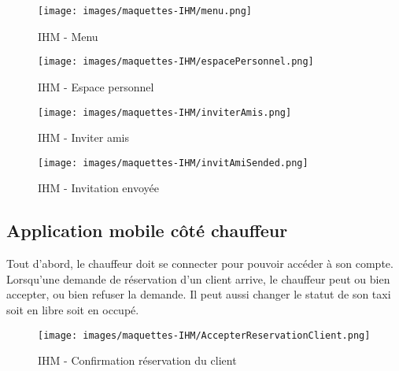{\begin{minipage}[c]{.46\linewidth}
\begin{figure}[H]
\centering
\texttt{[image: images/maquettes-IHM/menu.png]}
\caption{IHM - Menu}
\end{figure}

 \end{minipage}\hfill
\begin{minipage}[c]{.46\linewidth}
\begin{figure}[H]
\centering
\texttt{[image: images/maquettes-IHM/espacePersonnel.png]}
\caption{IHM - Espace personnel}
\end{figure}

\end{minipage}


\begin{minipage}[c]{.46\linewidth}
\begin{figure}[H]
\centering
\texttt{[image: images/maquettes-IHM/inviterAmis.png]}
\caption{IHM - Inviter amis}
\end{figure}

 \end{minipage}\hfill
\begin{minipage}[c]{.46\linewidth}
\begin{figure}[H]
\centering
\texttt{[image: images/maquettes-IHM/invitAmiSended.png]}
\caption{IHM - Invitation envoyée}
\end{figure}

\end{minipage}





\subsection*{Application mobile côté chauffeur}
Tout d’abord, le chauffeur doit se connecter pour pouvoir accéder à son compte.\\
Lorsqu’une demande de réservation d’un client arrive, le chauffeur peut ou bien accepter, ou bien refuser la demande. Il peut aussi changer le statut de son taxi soit en libre soit en occupé.


\begin{minipage}[c]{.46\linewidth}
\begin{figure}[H]
\centering
\texttt{[image: images/maquettes-IHM/AccepterReservationClient.png]}
\caption{IHM - Confirmation réservation du client}
\end{figure}


\end{minipage}}
